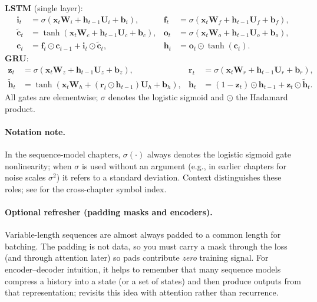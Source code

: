 \begin{tcolorbox}[summarybox, title={LSTM and GRU equations (compact)}]
\textbf{LSTM} (single layer):
\[
\begin{aligned}
    \mathbf{i}_t &= \sigma(\mathbf{x}_t\mathbf{W}_i+\mathbf{h}_{t-1}\mathbf{U}_i+\mathbf{b}_i), &
    \mathbf{f}_t &= \sigma(\mathbf{x}_t\mathbf{W}_f+\mathbf{h}_{t-1}\mathbf{U}_f+\mathbf{b}_f), \\
    \tilde{\mathbf{c}}_t &= \tanh(\mathbf{x}_t\mathbf{W}_c+\mathbf{h}_{t-1}\mathbf{U}_c+\mathbf{b}_c), &
    \mathbf{o}_t &= \sigma(\mathbf{x}_t\mathbf{W}_o+\mathbf{h}_{t-1}\mathbf{U}_o+\mathbf{b}_o), \\
    \mathbf{c}_t &= \mathbf{f}_t\odot \mathbf{c}_{t-1} + \mathbf{i}_t\odot \tilde{\mathbf{c}}_t, &
    \mathbf{h}_t &= \mathbf{o}_t\odot \tanh(\mathbf{c}_t).
\end{aligned}
\]
\textbf{GRU}:
\[
\begin{aligned}
    \mathbf{z}_t &= \sigma(\mathbf{x}_t\mathbf{W}_z+\mathbf{h}_{t-1}\mathbf{U}_z+\mathbf{b}_z), &
    \mathbf{r}_t &= \sigma(\mathbf{x}_t\mathbf{W}_r+\mathbf{h}_{t-1}\mathbf{U}_r+\mathbf{b}_r), \\
    \tilde{\mathbf{h}}_t &= \tanh(\mathbf{x}_t\mathbf{W}_h+(\mathbf{r}_t\odot\mathbf{h}_{t-1})\mathbf{U}_h+\mathbf{b}_h), &
    \mathbf{h}_t &= (1-\mathbf{z}_t)\odot \mathbf{h}_{t-1} + \mathbf{z}_t\odot \tilde{\mathbf{h}}_t.
\end{aligned}
\]
All gates are elementwise; $\sigma$ denotes the logistic sigmoid and $\odot$ the Hadamard product.

\paragraph{Notation note.} In the sequence\hyp{}model chapters, $\sigma(\cdot)$ always denotes the logistic sigmoid gate nonlinearity; when $\sigma$ is used without an argument (e.g., in earlier chapters for noise scales $\sigma^2$) it refers to a standard deviation. Context distinguishes these roles; see  for the cross-chapter symbol index.
\end{tcolorbox}

\paragraph{Optional refresher (padding masks and encoders).}
Variable-length sequences are almost always padded to a common length for batching. The padding is not data, so you must carry a mask through the loss (and through attention later) so pads contribute \emph{zero} training signal. For encoder--decoder intuition, it helps to remember that many sequence models compress a history into a state (or a set of states) and then produce outputs from that representation;  revisits this idea with attention rather than recurrence.

